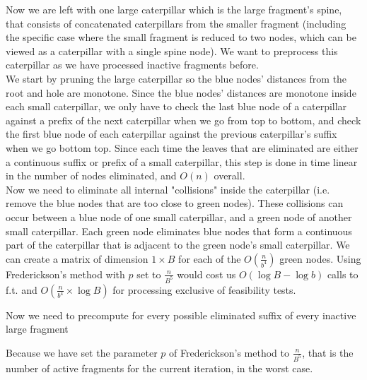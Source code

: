 \documentclass[11pt,a4paper]{article}
\theoremstyle{definition}
\theoremstyle{remark}
\begin{document}
Now we are left with one large caterpillar which is the large fragment's spine, that consists of concatenated caterpillars from the smaller fragment (including the specific case where the small fragment is reduced to two nodes, which can be viewed as a caterpillar with a single spine node). We want to preprocess this caterpillar as we have processed inactive fragments before.\\
We start by pruning the large caterpillar so the blue nodes' distances from the root and hole are monotone. Since the blue nodes' distances are monotone inside each small caterpillar, we only have to check the last blue node of a caterpillar against a prefix of the next caterpillar when we go from top to bottom, and check the first blue node of each caterpillar against the previous caterpillar's suffix when we go bottom top. Since each time the leaves that are eliminated are either a continuous suffix or prefix of a small caterpillar, this step is done in time linear in the number of nodes eliminated, and $O(n)$ overall.\\

Now we need to eliminate all internal "collisions" inside the caterpillar (i.e. remove the blue nodes that are too close to green nodes). These collisions can occur between a blue node of one small caterpillar, and a green node of another small caterpillar. Each green node eliminates blue nodes that form a continuous part of the caterpillar that is adjacent to the green node's small caterpillar. We can create a matrix of dimension $1 \times B$ for each of the $O(\frac{n}{b^4})$ green nodes. Using Frederickson's method with $p$ set to $\frac{n}{B^5}$ would cost us $O(\log B - \log b)$ calls to f.t. and $O(\frac{n}{b^4} \times \log B)$ for processing exclusive of feasibility tests.

Now we need to precompute for every possible eliminated suffix of every inactive large fragment

Because we have set the parameter $p$ of Frederickson's method to $\frac{n}{B^5}$, that is the number of active fragments for the current iteration, in the worst case.




\end{document}
